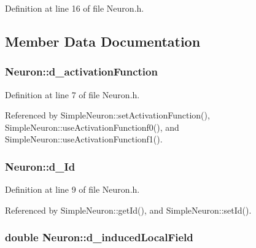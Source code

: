 Definition at line 16 of file Neuron.h.



\subsection{Member Data Documentation}
\hypertarget{class_neuron_ad530e9f0bb556e0469b5074e6b7f463f}{
\subsubsection[{d\_\-activationFunction}]{ {\bf Neuron::d\_\-activationFunction}}}
\label{class_neuron_ad530e9f0bb556e0469b5074e6b7f463f}


Definition at line 7 of file Neuron.h.



Referenced by SimpleNeuron::setActivationFunction(), SimpleNeuron::useActivationFunctionf0(), and SimpleNeuron::useActivationFunctionf1().

\hypertarget{class_neuron_ab1a34e30b663c41342e8f8eaac8bd466}{
\subsubsection[{d\_\-Id}]{ {\bf Neuron::d\_\-Id}}}
\label{class_neuron_ab1a34e30b663c41342e8f8eaac8bd466}


Definition at line 9 of file Neuron.h.



Referenced by SimpleNeuron::getId(), and SimpleNeuron::setId().

\hypertarget{class_neuron_a4370eae5b594fb4c7f544fcefa298c7c}{
\subsubsection[{d\_\-inducedLocalField}]{\setlength{\rightskip}{0pt plus 5cm}double {\bf Neuron::d\_\-inducedLocalField}}}
\label{class_neuron_a4370eae5b594fb4c7f544fcefa298c7c}


